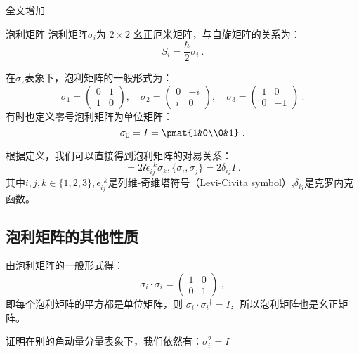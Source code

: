 
\begin{issues}
\issueDraft 全文增加\hat
\end{issues}


\begin{definition}{泡利矩阵}\label{def_pauliM_1}
泡利矩阵$\sigma_i$为 $2\times 2$ 幺正厄米矩阵，与自旋矩阵的关系为：
\begin{equation}
S_i=\frac{\hbar}{2}\sigma_i~.
\end{equation}
\end{definition}
在$\sigma_z$表象下，泡利矩阵的一般形式为：
\begin{equation}
\sigma_1 = \begin{pmatrix}
0 & 1\\
1 & 0
\end{pmatrix},\quad 
\sigma_2 = \begin{pmatrix}
0 & -i\\
i & 0
\end{pmatrix},\quad 
\sigma_3 = 
\begin{pmatrix}
1 & 0\\
0 & -1
\end{pmatrix}
~.
\end{equation}
有时也定义零号泡利矩阵为单位矩阵：
\begin{equation}
\sigma_0 = I=\pmat{1&0\\0&1}~.
\end{equation}

根据定义，我们可以直接得到泡利矩阵的对易关系：
\begin{equation}
[\sigma_i,\sigma_j]=2\mathcal i\epsilon ^{\,\,\, k}_{ij}\sigma_k,\{\sigma_i,\sigma_j\}=2\delta_{ij}I~.
\end{equation}
其中$i,j,k\in\{1,2,3\},\epsilon ^{\,\,\, k}_{ij}$是列维-奇维塔符号（Levi-Civita symbol）,$\delta_{ij}$是克罗内克函数。

\subsection{泡利矩阵的其他性质}
由泡利矩阵的一般形式得：
\begin{equation}
\sigma_i\cdot \sigma_i = \begin{pmatrix}1&0\\0&1\end{pmatrix}~,
\end{equation}
即每个泡利矩阵的平方都是单位矩阵，则 $\sigma_i \cdot  \sigma_i{}^\dagger = I$，所以泡利矩阵也是幺正矩阵。
\begin{exercise}{}
证明在别的角动量分量表象下，我们依然有：$\sigma_i^2=I$
\end{exercise}

